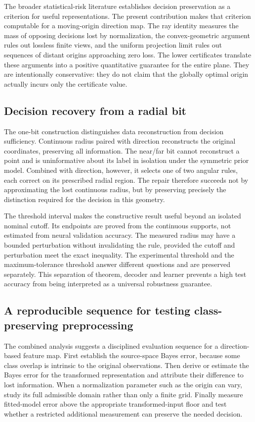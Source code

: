 \documentclass[12pt,a4paper]{article}
\begin{document}
The broader statistical-risk literature \citep{Silva2012,Silva2024,Gyorfi2023} establishes decision preservation as a criterion for useful representations. The present contribution makes that criterion computable for a moving-origin direction map. The ray identity measures the mass of opposing decisions lost by normalization, the convex-geometric argument rules out lossless finite views, and the uniform projection limit rules out sequences of distant origins approaching zero loss. The lower certificates translate these arguments into a positive quantitative guarantee for the entire plane. They are intentionally conservative: they do not claim that the globally optimal origin actually incurs only the certificate value.

\subsection{Decision recovery from a radial bit}
The one-bit construction distinguishes data reconstruction from decision sufficiency. Continuous radius paired with direction reconstructs the original coordinates, preserving all information. The near/far bit cannot reconstruct a point and is uninformative about its label in isolation under the symmetric prior model. Combined with direction, however, it selects one of two angular rules, each correct on its prescribed radial region. The repair therefore succeeds not by approximating the lost continuous radius, but by preserving precisely the distinction required for the decision in this geometry.

The threshold interval makes the constructive result useful beyond an isolated nominal cutoff. Its endpoints are proved from the continuous supports, not estimated from neural validation accuracy. The measured radius may have a bounded perturbation without invalidating the rule, provided the cutoff and perturbation meet the exact inequality. The experimental threshold and the maximum-tolerance threshold answer different questions and are preserved separately. This separation of theorem, decoder and learner prevents a high test accuracy from being interpreted as a universal robustness guarantee.

\subsection{A reproducible sequence for testing class-preserving preprocessing}
The combined analysis suggests a disciplined evaluation sequence for a direction-based feature map. First establish the source-space Bayes error, because some class overlap is intrinsic to the original observations. Then derive or estimate the Bayes error for the transformed representation and attribute their difference to lost information. When a normalization parameter such as the origin can vary, study its full admissible domain rather than only a finite grid. Finally measure fitted-model error above the appropriate transformed-input floor and test whether a restricted additional measurement can preserve the needed decision.
\end{document}
